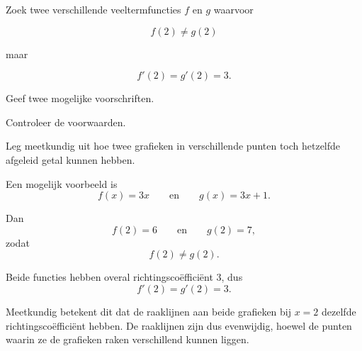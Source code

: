 \documentclass{ximera}
\begin{document}
\begin{oefening}{\oefG}

Zoek twee verschillende veeltermfuncties $f$ en $g$ waarvoor

\[
f(2)\neq g(2)
\]

maar

\[
f'(2)=g'(2)=3.
\]

\begin{question}
Geef twee mogelijke voorschriften.
\end{question}

\begin{question}
Controleer de voorwaarden.
\end{question}

\begin{question}
Leg meetkundig uit hoe twee grafieken in verschillende punten toch
hetzelfde afgeleid getal kunnen hebben.
\end{question}

\begin{oplossing}

Een mogelijk voorbeeld is
\[
f(x)=3x
\qquad\text{en}\qquad
g(x)=3x+1.
\]

Dan
\[
f(2)=6
\qquad\text{en}\qquad
g(2)=7,
\]
zodat
\[
f(2)\neq g(2).
\]

Beide functies hebben overal richtingscoëfficiënt $3$, dus
\[
f'(2)=g'(2)=3.
\]

Meetkundig betekent dit dat de raaklijnen aan beide grafieken bij
$x=2$ dezelfde richtingscoëfficiënt hebben. De raaklijnen zijn dus
evenwijdig, hoewel de punten waarin ze de grafieken raken verschillend
kunnen liggen.

\end{oplossing}

\end{oefening}


\end{document}
